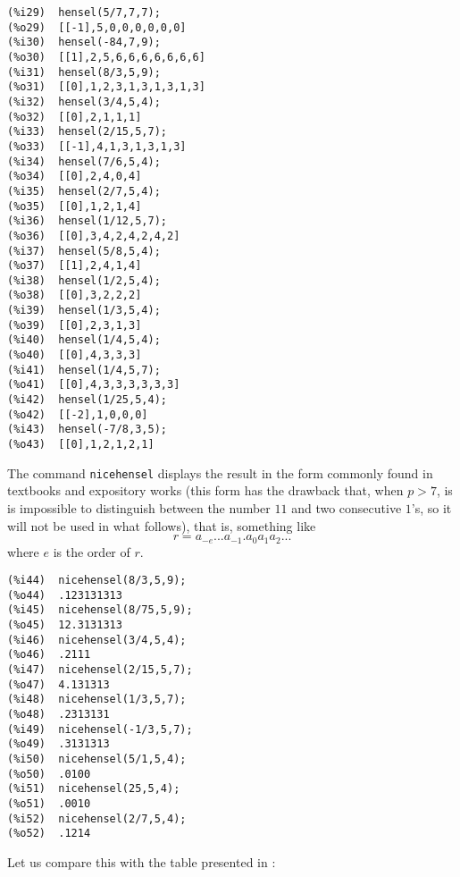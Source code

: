 \documentclass[fleqn]{cas-sc}
\begin{document}
\begin{verbatim}
(%i29)	hensel(5/7,7,7);
(%o29)	[[-1],5,0,0,0,0,0,0]
(%i30)	hensel(-84,7,9);
(%o30)	[[1],2,5,6,6,6,6,6,6,6]
(%i31)	hensel(8/3,5,9);
(%o31)	[[0],1,2,3,1,3,1,3,1,3]
(%i32)	hensel(3/4,5,4);
(%o32)	[[0],2,1,1,1]
(%i33)	hensel(2/15,5,7);
(%o33)	[[-1],4,1,3,1,3,1,3]
(%i34)	hensel(7/6,5,4);
(%o34)	[[0],2,4,0,4]
(%i35)	hensel(2/7,5,4);
(%o35)	[[0],1,2,1,4]
(%i36)	hensel(1/12,5,7);
(%o36)	[[0],3,4,2,4,2,4,2]
(%i37)	hensel(5/8,5,4);
(%o37)	[[1],2,4,1,4]
(%i38)	hensel(1/2,5,4);
(%o38)	[[0],3,2,2,2]
(%i39)	hensel(1/3,5,4);
(%o39)	[[0],2,3,1,3]
(%i40)	hensel(1/4,5,4);
(%o40)	[[0],4,3,3,3]
(%i41)	hensel(1/4,5,7);
(%o41)	[[0],4,3,3,3,3,3,3]
(%i42)	hensel(1/25,5,4);
(%o42)	[[-2],1,0,0,0]
(%i43)	hensel(-7/8,3,5);
(%o43)	[[0],1,2,1,2,1]
\end{verbatim}

The command \texttt{nicehensel} displays the result in the form commonly
found in textbooks and expository works (this form has the drawback
that, when $p>7$, is is impossible to distinguish between the number $11$
and two consecutive $1$'s, so it will not be used in what follows), that is, 
something like
$$
r = a_{-e}...a_{-1}{.}a_0a_1a_2...
$$
where $e$ is the order of $r$.

\begin{verbatim}
(%i44)	nicehensel(8/3,5,9);
(%o44)	.123131313
(%i45)	nicehensel(8/75,5,9);
(%o45)	12.3131313
(%i46)	nicehensel(3/4,5,4);
(%o46)	.2111
(%i47)	nicehensel(2/15,5,7);
(%o47)	4.131313
(%i48)	nicehensel(1/3,5,7);
(%o48)	.2313131
(%i49)	nicehensel(-1/3,5,7);
(%o49)	.3131313
(%i50)	nicehensel(5/1,5,4);
(%o50)	.0100
(%i51)	nicehensel(25,5,4);
(%o51)	.0010
(%i52)	nicehensel(2/7,5,4);
(%o52)	.1214
\end{verbatim}

Let us compare this with the table presented in \cite{2}:
\end{document}
